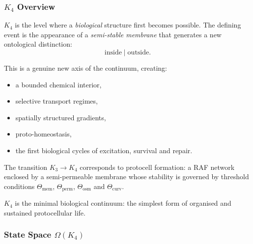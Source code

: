 

\subsubsection{\texorpdfstring{$K_4$}{K_4} Overview}
\label{sec:k4-overview}

$K_4$ is the level where a \emph{biological} structure first becomes
possible. The defining event is the appearance of a \emph{semi-stable
membrane} that generates a new ontological distinction:
\[
\text{inside} \;|\; \text{outside}.
\]

This is a genuine new axis of the continuum, creating:
\begin{itemize}
    \item a bounded chemical interior,
    \item selective transport regimes,
    \item spatially structured gradients,
    \item proto-homeostasis,
    \item the first biological cycles of excitation, survival and repair.
\end{itemize}

The transition $K_3 \to K_4$ corresponds to protocell formation: a RAF
network enclosed by a semi-permeable membrane whose stability is governed
by threshold conditions $\Theta_{\mathrm{mem}}$,
$\Theta_{\mathrm{perm}}$, $\Theta_{\mathrm{osm}}$ and
$\Theta_{\mathrm{curv}}$.

$K_4$ is the minimal biological continuum: the simplest form of organised
and sustained protocellular life.

\subsubsection{State Space \texorpdfstring{$\Omega(K_4)$}{\Omega(K_4)}}

